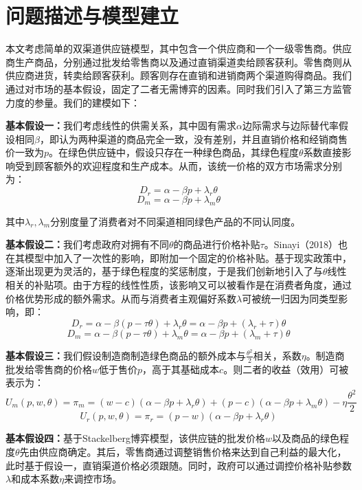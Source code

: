 \documentclass{article}
\begin{document}
\section{问题描述与模型建立}
\par 本文考虑简单的双渠道供应链模型，其中包含一个供应商和一个一级零售商。供应商生产商品，分别通过批发给零售商以及通过直销渠道卖给顾客获利。零售商则从供应商进货，转卖给顾客获利。顾客则存在直销和进销商两个渠道购得商品。我们通过对市场的基本假设，固定了二者无需博弈的因素。同时我们引入了第三方监管力度的参量。我们的建模如下：
\par \textbf{基本假设一：}我们考虑线性的供需关系，其中固有需求$\alpha$边际需求与边际替代率假设相同$\beta$，即认为两种渠道的商品完全一致，没有差别，并且直销价格和经销商售价一致为$p$\cite{2016Li}。在绿色供应链中，假设只存在一种绿色商品，其绿色程度$\theta$系数直接影响受到顾客额外的欢迎程度和生产成本\cite{2012Ghosh}。从而，该统一价格的双方市场需求分别为：
\begin{equation}
    D_r=\alpha-\beta p+\lambda_r\theta
\end{equation}
\begin{equation}
    D_m=\alpha-\beta p+\lambda_m\theta
\end{equation}
\par 其中$\lambda_r, \lambda_m$分别度量了消费者对不同渠道相同绿色产品的不同认同度。
\par \textbf{基本假设二：}我们考虑政府对拥有不同$\theta$的商品进行价格补贴$\tau$。Sinayi（2018）也在其模型中加入了一次性的影响，即附加一个固定的价格补贴\cite{2018Sinayi}。基于现实政策中，逐渐出现更为灵活的，基于绿色程度的奖惩制度，于是我们创新地引入了与$\theta$线性相关的补贴项。由于方程的线性性质，该影响又可以被看作是在消费者角度，通过价格优势形成的额外需求。从而与消费者主观偏好系数$\lambda$可被统一归因为同类型影响，即：
\begin{equation}
    D_r=\alpha-\beta (p-\tau\theta)+\lambda_r\theta=\alpha-\beta p+(\lambda_r+\tau)\theta
\end{equation}
\begin{equation}
    D_m=\alpha-\beta (p-\tau\theta)+\lambda_m\theta=\alpha-\beta p+(\lambda_m+\tau)\theta
\end{equation}
\par \textbf{基本假设三：}我们假设制造商制造绿色商品的额外成本与$\frac{\theta^2}{2}$相关，系数$\eta$。制造商批发给零售商的价格$w$低于售价$p$，高于其基础成本$c$。则二者的收益（效用）可被表示为\cite{2012Ghosh}\cite{2016Li}：
\begin{equation}\label{U_m}
    U_m(p,w,\theta)=\pi_m=(w-c)(\alpha-\beta p+\lambda_r\theta)+(p-c)(\alpha-\beta p+\lambda_m\theta)-\eta\frac{\theta^2}{2}
\end{equation}
\begin{equation}\label{U_r}
    U_r(p,w,\theta)=\pi_r=(p-w)(\alpha-\beta p+\lambda_r\theta)
\end{equation}
\par \textbf{基本假设四：}基于Stackelberg博弈模型，该供应链的批发价格$w$以及商品的绿色程度$\theta$先由供应商确定。其后，零售商通过调整销售价格来达到自己利益的最大化\cite{2009Wang}，此时基于假设一，直销渠道价格必须跟随。同时，政府可以通过调控价格补贴参数$\lambda$和成本系数$\eta$来调控市场。
\end{document}
